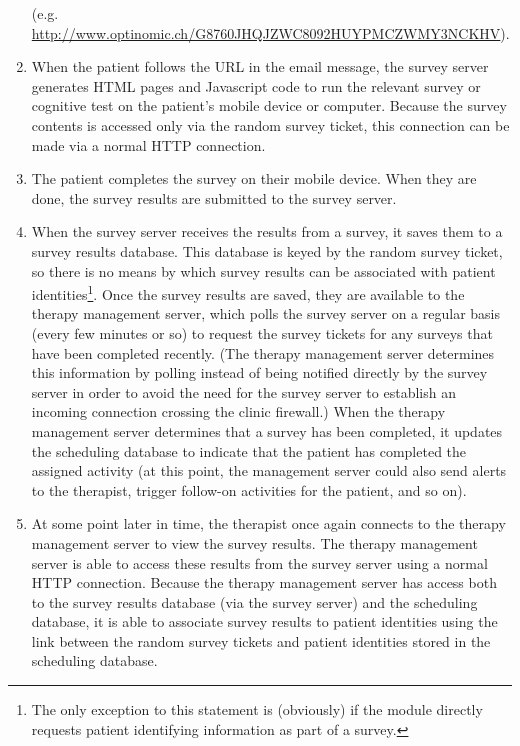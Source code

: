 \documentclass[DIV=calc,paper=a4,fontsize=11pt,twocolumn]{scrartcl}
\begin{document}
\begin{enumerate}
{    (e.g. \url{http://www.optinomic.ch/G8760JHQJZWC8092HUYPMCZWMY3NCKHV}).}
  \item{When the patient follows the URL in the email message, the
    survey server generates HTML pages and Javascript code to run the
    relevant survey or cognitive test on the patient's mobile device
    or computer.  Because the survey contents is accessed only via the
    random survey ticket, this connection can be made via a normal
    HTTP connection.}
  \item{The patient completes the survey on their mobile device.  When
    they are done, the survey results are submitted to the survey
    server.}
  \item{When the survey server receives the results from a survey, it
    saves them to a survey results database.  This database is keyed
    by the random survey ticket, so there is no means by which survey
    results can be associated with patient identities\footnote{The
      only exception to this statement is (obviously) if the module
      directly requests patient identifying information as part of a
      survey.}.  Once the survey results are saved, they are available
    to the therapy management server, which polls the survey server on
    a regular basis (every few minutes or so) to request the survey
    tickets for any surveys that have been completed recently.  (The
    therapy management server determines this information by polling
    instead of being notified directly by the survey server in order
    to avoid the need for the survey server to establish an incoming
    connection crossing the clinic firewall.)  When the therapy
    management server determines that a survey has been completed, it
    updates the scheduling database to indicate that the patient has
    completed the assigned activity (at this point, the management
    server could also send alerts to the therapist, trigger follow-on
    activities for the patient, and so on).}
  \item{At some point later in time, the therapist once again connects
    to the therapy management server to view the survey results.  The
    therapy management server is able to access these results from the
    survey server using a normal HTTP connection.  Because the therapy
    management server has access both to the survey results database
    (via the survey server) and the scheduling database, it is able to
    associate survey results to patient identities using the link
    between the random survey tickets and patient identities stored in
    the scheduling database.}
\end{enumerate}
\end{document}
